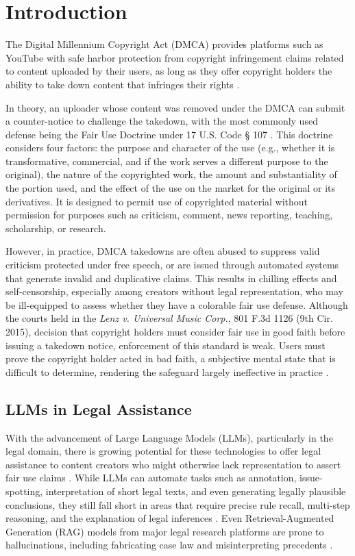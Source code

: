\section{Introduction}

The Digital Millennium Copyright Act (DMCA) provides platforms such as YouTube with safe harbor protection from copyright infringement claims related to content uploaded by their users, as long as they offer copyright holders the ability to take down content that infringes their rights \cite{16_DMCA}.

In theory, an uploader whose content was removed under the DMCA can submit a counter-notice to challenge the takedown, with the most commonly used defense being the Fair Use Doctrine under 17 U.S. Code § 107 \cite{15_USC107}. This doctrine considers four factors: the purpose and character of the use (e.g., whether it is transformative, commercial, and if the work serves a different purpose to the original), the nature of the copyrighted work, the amount and substantiality of the portion used, and the effect of the use on the market for the original or its derivatives. It is designed to permit use of copyrighted material without permission for purposes such as criticism, comment, news reporting, teaching, scholarship, or research.

However, in practice, DMCA takedowns are often abused to suppress valid criticism protected under free speech, or are issued through automated systems that generate invalid and duplicative claims. This results in chilling effects and self-censorship, especially among creators without legal representation, who may be ill-equipped to assess whether they have a colorable fair use defense. Although the courts held in the \textit{Lenz v. Universal Music Corp.}, 801 F.3d 1126 (9th Cir. 2015), decision that copyright holders must consider fair use in good faith before issuing a takedown notice, enforcement of this standard is weak. Users must prove the copyright holder acted in bad faith, a subjective mental state that is difficult to determine, rendering the safeguard largely ineffective in practice \cite{21a_DMCAAbuse, 21b_DMCAAbuse}.

\subsection{LLMs in Legal Assistance}

With the advancement of Large Language Models (LLMs), particularly in the legal domain, there is growing potential for these technologies to offer legal assistance to content creators who might otherwise lack representation to assert fair use claims \cite{10_LLMFewShotLearner, 20_LLMSurvey, 05_BuildingJusticeBot}. While LLMs can automate tasks such as annotation, issue-spotting, interpretation of short legal texts, and even generating legally plausible conclusions, they still fall short in areas that require precise rule recall, multi-step reasoning, and the explanation of legal inferences \cite{06_GPTAnnotateTextualData, 22_LegalBench}. Even Retrieval-Augmented Generation (RAG) models from major legal research platforms are prone to hallucinations, including fabricating case law and misinterpreting precedents \cite{04_LegalHallucination, 04b_HallucinationFree}.

